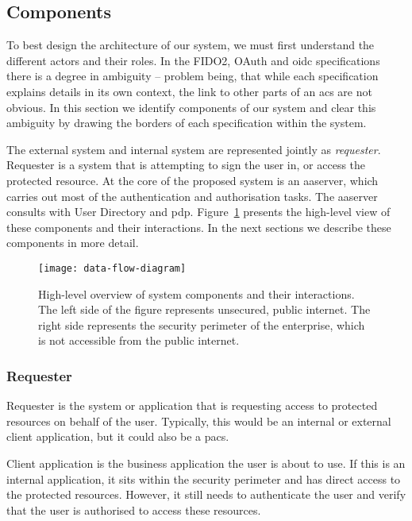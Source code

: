 \subsection{Components}
To best design the architecture of our system, we must first understand the different actors and their roles. In the FIDO2, OAuth and \acrshort{oidc} specifications there is a degree in ambiguity -- problem being, that while each specification explains details in its own context, the link to other parts of an \acrshort{acs} are not obvious. In this section we identify components of our system and clear this ambiguity by drawing the borders of each specification within the system.

The external system and internal system are represented jointly as \textit{requester}. Requester is a system that is attempting to sign the user in, or access the protected resource. At the core of the proposed system is an \acrfull{aaserver}, which carries out most of the authentication and authorisation tasks. The \acrshort{aaserver} consults with User Directory and \acrfull{pdp}. Figure~\ref{fig:data-flow-diagram} presents the high-level view of these components and their interactions. In the next sections we describe these components in more detail.

\begin{figure}[ht]
    \centering
    \texttt{[image: data-flow-diagram]}
    \caption{High-level overview of system components and their interactions. The left side of the figure represents unsecured, public internet. The right side represents the security perimeter of the enterprise, which is not accessible from the public internet.}
    \label{fig:data-flow-diagram}
\end{figure}

\subsubsection{Requester} 
Requester is the system or application that is requesting access to protected resources on behalf of the user. Typically, this would be an internal or external client application, but it could also be a \acrshort{pacs}.

Client application is the business application the user is about to use. If this is an internal application, it sits within the security perimeter and has direct access to the protected resources. However, it still needs to authenticate the user and verify that the user is authorised to access these resources.

